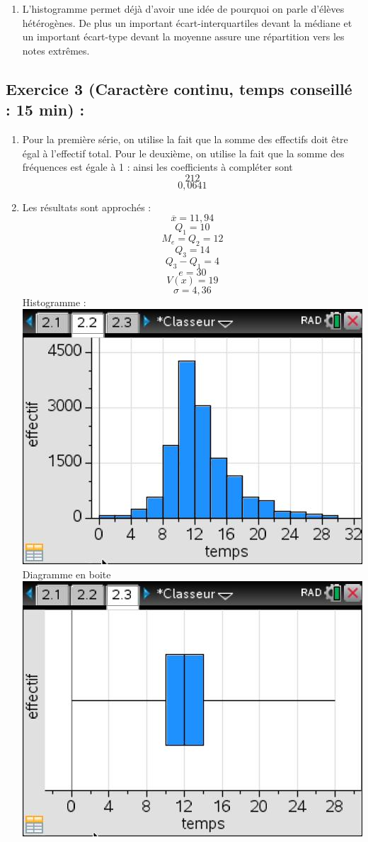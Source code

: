 \begin{enumerate}
\item L'histogramme permet déjà d'avoir une idée de pourquoi on parle d'élèves hétérogènes. De plus un important écart-interquartiles devant la médiane et un important écart-type devant la moyenne assure une répartition vers les notes extrêmes.
\end{enumerate}
\subsection*{Exercice 3 (Caractère continu, temps conseillé : 15 min) : }
\begin{enumerate}
\item Pour la première série, on utilise la fait que la somme des effectifs doit être égal à l'effectif total. Pour le deuxième, on utilise la fait que la somme des fréquences est égale à 1 : ainsi les coefficients à compléter sont 
$$\boxed{212}$$
$$\boxed{0,0641}$$
\item Les résultats sont approchés : 
$$\boxed{\overline{x} = 11,94}$$
$$\boxed{Q_1 = 10}$$
$$\boxed{M_e = Q_2 = 12}$$ 
$$\boxed{Q_3 = 14}$$
$$\boxed{Q_3-Q_1 = 4}$$
$$\boxed{e = 30}$$
$$\boxed{V(x) = 19}$$
$$\boxed{\sigma =4,36}$$
Histogramme : \newline
\includegraphics[scale=0.5]{chap8_corr_ill4.jpg}\newline
Diagramme en boite\newline
\includegraphics[scale=0.5]{chap8_corr_ill5.jpg}\newline

\end{enumerate}
